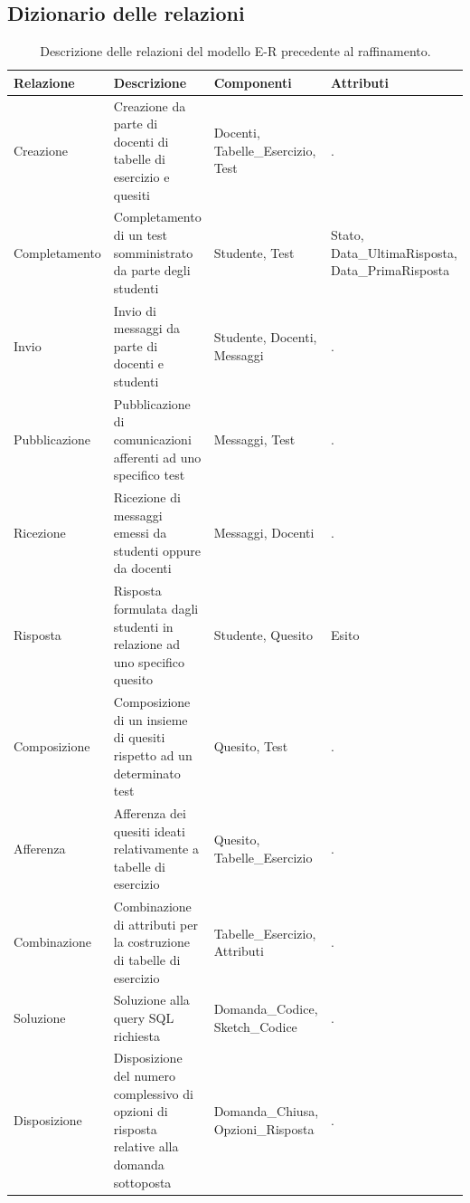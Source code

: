 \documentclass{article}
\begin{document}
\subsection{Dizionario delle relazioni}
\large
\begin{table}[H]
    \centering
    \begin{tabularx}{\textwidth}{|X|p{5cm}|p{3cm}|X|}
        \hline
        \bf Relazione & \bf Descrizione & \bf Componenti & \bf Attributi \\
        \hline
        Creazione & Creazione da parte di docenti di tabelle di esercizio e quesiti & Docenti, Tabelle\_Esercizio, Test & . \\
        \hline
        Completamento & Completamento di un test somministrato da parte degli studenti & Studente, Test & Stato, Data\_UltimaRisposta, Data\_PrimaRisposta \\
        \hline
        Invio & Invio di messaggi da parte di docenti e studenti & Studente, Docenti, Messaggi & . \\
        \hline 
        Pubblicazione & Pubblicazione di comunicazioni afferenti ad uno specifico test & Messaggi, Test & . \\
        \hline
        Ricezione & Ricezione di messaggi emessi da studenti oppure da docenti & Messaggi, Docenti & . \\
        \hline
        Risposta & Risposta formulata dagli studenti in relazione ad uno specifico quesito & Studente, Quesito & Esito \\
        \hline
        Composizione & Composizione di un insieme di quesiti rispetto ad un determinato test & Quesito, Test & . \\
        \hline
        Afferenza & Afferenza dei quesiti ideati relativamente a tabelle di esercizio & Quesito, Tabelle\_Esercizio & . \\
        \hline
        Combinazione & Combinazione di attributi per la costruzione di tabelle di esercizio & Tabelle\_Esercizio, Attributi & . \\
        \hline
        Soluzione & Soluzione alla query SQL richiesta & Domanda\_Codice, Sketch\_Codice & . \\
        \hline
        Disposizione & Disposizione del numero complessivo di opzioni di risposta relative alla domanda sottoposta & Domanda\_Chiusa, Opzioni\_Risposta & . \\    
        \hline
    \end{tabularx}
    \caption{Descrizione delle relazioni del modello E-R precedente al raffinamento.}
\end{table}
\end{document}
